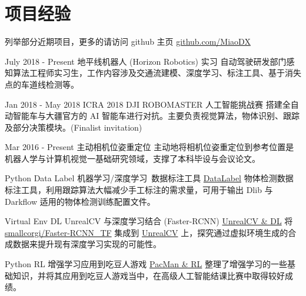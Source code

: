 \documentclass[utf8]{twentysecondcv} %
\begin{document}
\section{项目经验}
\begin{twenty}

    \twentyitem
        {}
        {}        
        {列举部分近期项目，更多的请访问 github 主页}
        {\href{https://github.com/MiaoDX/}{github.com/MiaoDX}}
        {}
        {}
    
        
    \twentyitem
    {July 2018 - }
    {Present}
    {地平线机器人 (Horizon Robotics) 实习}
    {}
    {}
    {自动驾驶研发部门感知算法工程师实习生，工作内容涉及交通流建模、深度学习、标注工具、基于消失点的车道线检测等。}
          
    \twentyitem
    {Jan 2018 - }
    {May 2018}
    {ICRA 2018 DJI ROBOMASTER 人工智能挑战赛}
    {}
    {}
    {搭建全自动智能车与大疆官方的 AI 智能车进行对抗。主要负责视觉算法，物体识别、跟踪及部分决策模块。(Finalist invitation)}
    
    \twentyitem
    {Mar 2016 -}
    {Present}
    {主动相机位姿重定位}
    {}
    {}
	{主动地将相机位姿重定位到参考位置是机器人学与计算机视觉一基础研究领域，支撑了本科毕设与会议论文。}
    
	\twentyitem
        {Python}
		{Data Label}
        {机器学习/深度学习\ 数据标注工具}
        {\href{https://github.com/MiaoDX/DataLabel}{DataLabel}}
        {}
        {物体检测数据标注工具，利用跟踪算法大幅减少手工标注的需求量，可用于输出 Dlib 与 Darkflow 适用的物体检测训练配置文件。}
          
    \twentyitem
        {Virtual Env}
      	{DL}
        {UnrealCV 与深度学习结合 (Faster-RCNN)}
        {\href{https://github.com/MiaoDX/unrealcv_examples/}{UnrealCV \& DL}}
        {}
        {将 \href{https://github.com/smallcorgi/Faster-RCNN\_TF}{smallcorgi/Faster-RCNN\_TF} 集成到 \href{https://github.com/unrealcv/unrealcv}{UnrealCV} 上，探究通过虚拟环境生成的合成数据来提升现有深度学习实现的可能性。}
                 
    \twentyitem
        {Python}
		{RL}
        {增强学习应用到吃豆人游戏}
        {\href{https://github.com/MiaoDX/hand_in_homework/tree/master/Advanced\_AI/}{PacMan \& RL}}
        {}
        {整理了增强学习的一些基础知识，并将其应用到吃豆人游戏当中，在高级人工智能结课比赛中取得较好成绩。}
        

\end{twenty}
\end{document}
